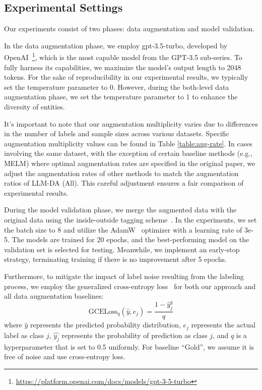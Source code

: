 \documentclass[11pt]{article}
\begin{document}
\subsection{Experimental Settings}

Our experiments consist of two phases: data augmentation and model validation.

In the data augmentation phase, we employ gpt-3.5-turbo, developed by OpenAI~\footnote{\url{https://platform.openai.com/docs/models/gpt-3-5-turbo}}, which is the most capable model from the GPT-3.5 sub-series. To fully harness its capabilities, we maximize the model's output length to 2048 tokens. For the sake of reproducibility in our experimental results, we typically set the temperature parameter to 0. However, during the both-level data augmentation phase, we set the temperature parameter to 1 to enhance the diversity of entities.

It's important to note that our augmentation multiplicity varies due to differences in the number of labels and sample sizes across various datasets. Specific augmentation multiplicity values can be found in Table \ref{table:aug-rate}. In cases involving the same dataset, with the exception of certain baseline methods (e.g., MELM) where optimal augmentation rates are specified in the original paper, we adjust the augmentation rates of other methods to match the augmentation ratios of LLM-DA (All). This careful adjustment ensures a fair comparison of experimental results.

During the model validation phase, we merge the augmented data with the original data
using the inside-outside tagging scheme~\cite{IO-scheme}. In the experiments, we set the batch size to 8 and utilize the AdamW~\cite{AdamW} optimizer with a learning rate of 3e-5. The models are trained for 20 epochs, and the best-performing model on the validation set is selected for testing. Meanwhile, we implement an early-stop strategy, terminating training if there is no improvement after 5 epochs.

Furthermore, to mitigate the impact of label noise resulting from the labeling process, we employ the generalized cross-entropy loss~\cite{GCELoss} for  both our approach and all data augmentation baselines:
\begin{equation*}
    \mathrm{GCELoss}_q(\hat{y}, e_j)=\frac{1-\hat{y}_j^q}{q}
\end{equation*}
where $\hat{y}$ represents the predicted probability distribution, $e_j$ represents the actual label as class $j$, $\hat{y_j}$ represents the probability of prediction as class $j$, and $q$ is a hyperparameter that is set to 0.5 uniformly. For baseline ``Gold'', we assume it is free of noise and use cross-entropy loss.
\end{document}
